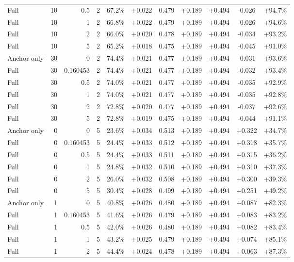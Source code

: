 \begin{table}[htbp]
\begin{tabular}{lrrrccccccc}
Full & 10 & 0.5 & 2 & 67.2\% & +0.022 & 0.479 & +0.189 & +0.494 & -0.026 & +94.7\% \\
Full & 10 & 1 & 2 & 66.8\% & +0.022 & 0.479 & +0.189 & +0.494 & -0.026 & +94.6\% \\
Full & 10 & 2 & 2 & 66.0\% & +0.020 & 0.478 & +0.189 & +0.494 & -0.034 & +93.2\% \\
Full & 10 & 5 & 2 & 65.2\% & +0.018 & 0.475 & +0.189 & +0.494 & -0.045 & +91.0\% \\
Anchor only & 30 & 0 & 2 & 74.4\% & +0.021 & 0.477 & +0.189 & +0.494 & -0.031 & +93.6\% \\
Full & 30 & 0.160453 & 2 & 74.4\% & +0.021 & 0.477 & +0.189 & +0.494 & -0.032 & +93.4\% \\
Full & 30 & 0.5 & 2 & 74.0\% & +0.021 & 0.477 & +0.189 & +0.494 & -0.035 & +92.9\% \\
Full & 30 & 1 & 2 & 74.0\% & +0.021 & 0.477 & +0.189 & +0.494 & -0.035 & +92.8\% \\
Full & 30 & 2 & 2 & 72.8\% & +0.020 & 0.477 & +0.189 & +0.494 & -0.037 & +92.6\% \\
Full & 30 & 5 & 2 & 72.8\% & +0.019 & 0.475 & +0.189 & +0.494 & -0.044 & +91.1\% \\
Anchor only & 0 & 0 & 5 & 23.6\% & +0.034 & 0.513 & +0.189 & +0.494 & +0.322 & +34.7\% \\
Full & 0 & 0.160453 & 5 & 24.4\% & +0.033 & 0.512 & +0.189 & +0.494 & +0.318 & +35.7\% \\
Full & 0 & 0.5 & 5 & 24.4\% & +0.033 & 0.511 & +0.189 & +0.494 & +0.315 & +36.2\% \\
Full & 0 & 1 & 5 & 24.8\% & +0.032 & 0.510 & +0.189 & +0.494 & +0.310 & +37.3\% \\
Full & 0 & 2 & 5 & 26.0\% & +0.032 & 0.508 & +0.189 & +0.494 & +0.300 & +39.3\% \\
Full & 0 & 5 & 5 & 30.4\% & +0.028 & 0.499 & +0.189 & +0.494 & +0.251 & +49.2\% \\
Anchor only & 1 & 0 & 5 & 40.8\% & +0.026 & 0.480 & +0.189 & +0.494 & +0.087 & +82.3\% \\
Full & 1 & 0.160453 & 5 & 41.6\% & +0.026 & 0.479 & +0.189 & +0.494 & +0.083 & +83.2\% \\
Full & 1 & 0.5 & 5 & 42.0\% & +0.026 & 0.480 & +0.189 & +0.494 & +0.082 & +83.4\% \\
Full & 1 & 1 & 5 & 43.2\% & +0.025 & 0.479 & +0.189 & +0.494 & +0.074 & +85.1\% \\
Full & 1 & 2 & 5 & 44.4\% & +0.024 & 0.478 & +0.189 & +0.494 & +0.063 & +87.3\% \\

\end{tabular}
\end{table}
